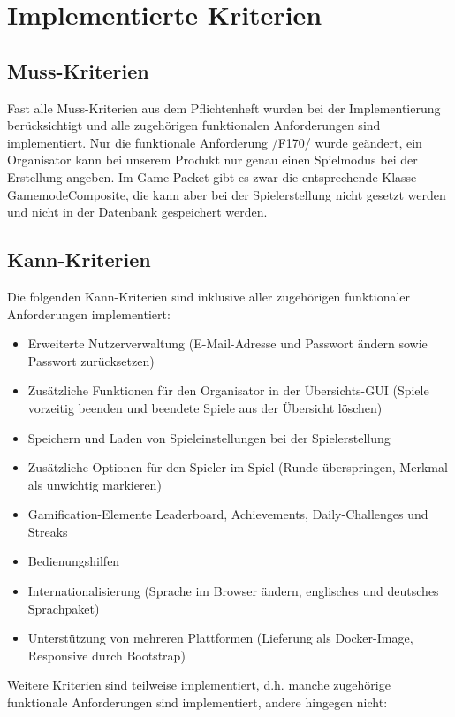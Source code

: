 \documentclass[a4paper]{scrreprt}
\begin{document}
\chapter{Implementierte Kriterien}

\section{Muss-Kriterien}
Fast alle Muss-Kriterien aus dem Pflichtenheft wurden bei der Implementierung berücksichtigt und alle zugehörigen funktionalen Anforderungen sind implementiert. Nur die funktionale Anforderung /F170/ wurde geändert, ein Organisator kann bei unserem Produkt nur genau einen Spielmodus bei der Erstellung angeben. Im Game-Packet gibt es zwar die entsprechende Klasse GamemodeComposite, die kann aber bei der Spielerstellung nicht gesetzt werden und nicht in der Datenbank gespeichert werden.
	

\section{Kann-Kriterien}
Die folgenden Kann-Kriterien sind inklusive aller zugehörigen funktionaler Anforderungen implementiert:

\begin{itemize}
\item Erweiterte Nutzerverwaltung (E-Mail-Adresse und Passwort ändern sowie Passwort zurücksetzen)
\item Zusätzliche Funktionen für den Organisator in der Übersichts-GUI (Spiele vorzeitig beenden und beendete Spiele aus der Übersicht löschen)
\item Speichern und Laden von Spieleinstellungen bei der Spielerstellung
\item Zusätzliche Optionen für den Spieler im Spiel (Runde überspringen, Merkmal als unwichtig markieren)
\item Gamification-Elemente Leaderboard, Achievements, Daily-Challenges und Streaks
\item Bedienungshilfen
\item Internationalisierung (Sprache im Browser ändern, englisches und deutsches Sprachpaket)
\item Unterstützung von mehreren Plattformen (Lieferung als Docker-Image, Responsive durch Bootstrap)
\end{itemize}

\hspace{1cm}

Weitere Kriterien sind teilweise implementiert, d.h. manche zugehörige funktionale Anforderungen sind implementiert, andere hingegen nicht:
\end{document}
